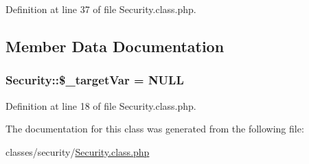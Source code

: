 Definition at line 37 of file Security.\-class.\-php.



\subsection{Member Data Documentation}
\hypertarget{classSecurity_a28ff37b08bd7a592552cf5af13f7ac74}{
\subsubsection[{\$\-\_\-target\-Var}]{\setlength{\rightskip}{0pt plus 5cm}Security\-::\$\-\_\-target\-Var = N\-U\-L\-L}}\label{classSecurity_a28ff37b08bd7a592552cf5af13f7ac74}


Definition at line 18 of file Security.\-class.\-php.



The documentation for this class was generated from the following file\-:\begin{DoxyCompactItemize}
\item 
classes/security/\hyperlink{Security_8class_8php}{Security.\-class.\-php}\end{DoxyCompactItemize}
